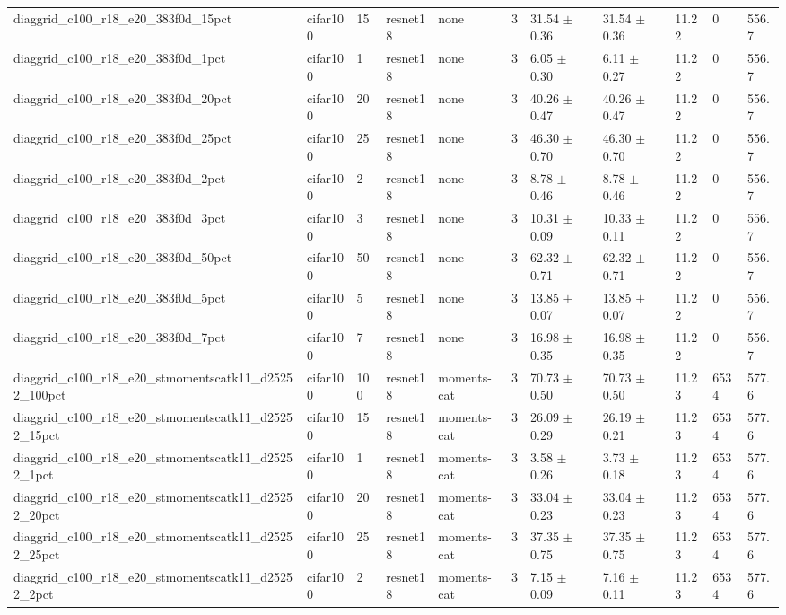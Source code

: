 \begin{tabular}{lllllllllll}
diaggrid_c100_r18_e20_383f0d_15pct & cifar100 & 15 & resnet18 & none & 3 & 31.54 $\pm$ 0.36 & 31.54 $\pm$ 0.36 & 11.22 & 0 & 556.7 \\
diaggrid_c100_r18_e20_383f0d_1pct & cifar100 & 1 & resnet18 & none & 3 & 6.05 $\pm$ 0.30 & 6.11 $\pm$ 0.27 & 11.22 & 0 & 556.7 \\
diaggrid_c100_r18_e20_383f0d_20pct & cifar100 & 20 & resnet18 & none & 3 & 40.26 $\pm$ 0.47 & 40.26 $\pm$ 0.47 & 11.22 & 0 & 556.7 \\
diaggrid_c100_r18_e20_383f0d_25pct & cifar100 & 25 & resnet18 & none & 3 & 46.30 $\pm$ 0.70 & 46.30 $\pm$ 0.70 & 11.22 & 0 & 556.7 \\
diaggrid_c100_r18_e20_383f0d_2pct & cifar100 & 2 & resnet18 & none & 3 & 8.78 $\pm$ 0.46 & 8.78 $\pm$ 0.46 & 11.22 & 0 & 556.7 \\
diaggrid_c100_r18_e20_383f0d_3pct & cifar100 & 3 & resnet18 & none & 3 & 10.31 $\pm$ 0.09 & 10.33 $\pm$ 0.11 & 11.22 & 0 & 556.7 \\
diaggrid_c100_r18_e20_383f0d_50pct & cifar100 & 50 & resnet18 & none & 3 & 62.32 $\pm$ 0.71 & 62.32 $\pm$ 0.71 & 11.22 & 0 & 556.7 \\
diaggrid_c100_r18_e20_383f0d_5pct & cifar100 & 5 & resnet18 & none & 3 & 13.85 $\pm$ 0.07 & 13.85 $\pm$ 0.07 & 11.22 & 0 & 556.7 \\
diaggrid_c100_r18_e20_383f0d_7pct & cifar100 & 7 & resnet18 & none & 3 & 16.98 $\pm$ 0.35 & 16.98 $\pm$ 0.35 & 11.22 & 0 & 556.7 \\
diaggrid_c100_r18_e20_stmomentscatk11_d25252_100pct & cifar100 & 100 & resnet18 & moments-cat & 3 & 70.73 $\pm$ 0.50 & 70.73 $\pm$ 0.50 & 11.23 & 6534 & 577.6 \\
diaggrid_c100_r18_e20_stmomentscatk11_d25252_15pct & cifar100 & 15 & resnet18 & moments-cat & 3 & 26.09 $\pm$ 0.29 & 26.19 $\pm$ 0.21 & 11.23 & 6534 & 577.6 \\
diaggrid_c100_r18_e20_stmomentscatk11_d25252_1pct & cifar100 & 1 & resnet18 & moments-cat & 3 & 3.58 $\pm$ 0.26 & 3.73 $\pm$ 0.18 & 11.23 & 6534 & 577.6 \\
diaggrid_c100_r18_e20_stmomentscatk11_d25252_20pct & cifar100 & 20 & resnet18 & moments-cat & 3 & 33.04 $\pm$ 0.23 & 33.04 $\pm$ 0.23 & 11.23 & 6534 & 577.6 \\
diaggrid_c100_r18_e20_stmomentscatk11_d25252_25pct & cifar100 & 25 & resnet18 & moments-cat & 3 & 37.35 $\pm$ 0.75 & 37.35 $\pm$ 0.75 & 11.23 & 6534 & 577.6 \\
diaggrid_c100_r18_e20_stmomentscatk11_d25252_2pct & cifar100 & 2 & resnet18 & moments-cat & 3 & 7.15 $\pm$ 0.09 & 7.16 $\pm$ 0.11 & 11.23 & 6534 & 577.6 \\

\end{tabular}
